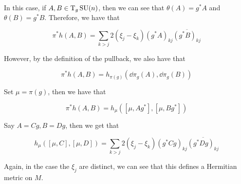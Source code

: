 \documentclass{article}
\DeclareMathOperator{\SU}{SU}
\begin{document}
In this case, if \(A, B \in \TT_g\SU(n)\), then we can see that \(\theta(A) = g^* A\) and \(\theta(B) = g^* B\). Therefore, we have that

\[\pi^*h(A, B) = \sum_{k > j}2(\xi_j - \xi_k)(g^* A)_{kj}\overline{(g^* B)_{kj}}\]

However, by the definition of the pullback, we also have that

\[\pi^*h(A, B) = h_{\pi(g)}(\dd \pi_g(A), \dd\pi_g(B))\]

Set \(\mu = \pi(g)\), then we have that

\[\pi^*h(A, B) = h_\mu([\mu, Ag^*], [\mu, Bg^*])\]

Say \(A = Cg, B = Dg\), then we get that

\[h_\mu([\mu, C], [\mu, D]) = \sum_{k > j}2(\xi_j - \xi_k)(g^* Cg)_{kj}\overline{(g^* Dg)_{kj}}\]

Again, in the case the \(\xi_j\) are distinct, we can see that this defines a Hermitian metric on \( M\).

\printbibliography
\end{document}
